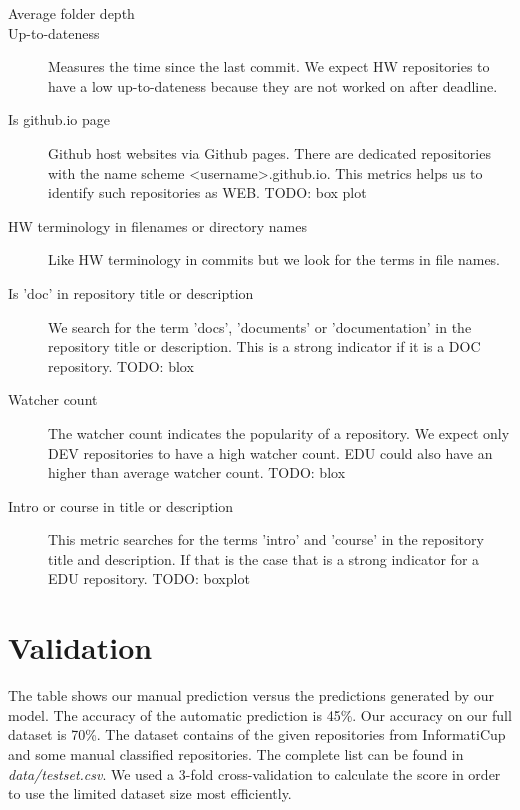 \documentclass[a4paper]{scrartcl}
\begin{document}
\begin{description}
	\item[Average folder depth]
	\item[Up-to-dateness]
	Measures the time since the last commit. We expect HW repositories to have a low up-to-dateness because they are not worked on after deadline.
	\item[Is github.io page]
	Github host websites via Github pages. There are dedicated repositories with the name scheme <username>.github.io. This metrics helps us to identify such repositories as WEB.
	TODO: box plot
	\item[HW terminology in filenames or directory names]
	Like HW terminology in commits but we look for the terms in file names.
	
	\item[Is 'doc' in repository title or description]
	We search for the term 'docs', 'documents' or 'documentation' in the repository title or description. This is a strong indicator if it is a DOC repository.
	TODO: blox
	\item[Watcher count]
	The watcher count indicates the popularity of a repository. We expect only DEV repositories to have a high watcher count. EDU could also have an higher than average watcher count.
	TODO: blox
	\item[Intro or course in title or description]
	This metric searches for the terms 'intro' and 'course' in the repository title and description. If that is the case that is a strong indicator for a EDU repository.
	TODO: boxplot
	
\end{description}
	

\section{Validation}

The table shows our manual prediction versus the predictions generated by our model. The accuracy of the automatic prediction is 45\%. Our accuracy on our full dataset is 70\%. The dataset contains of the given repositories from InformatiCup and some manual classified repositories. The complete list can be found in \textit{data/testset.csv}. We used a 3-fold cross-validation to calculate the score in order to use the limited dataset size most efficiently.
\end{document}
